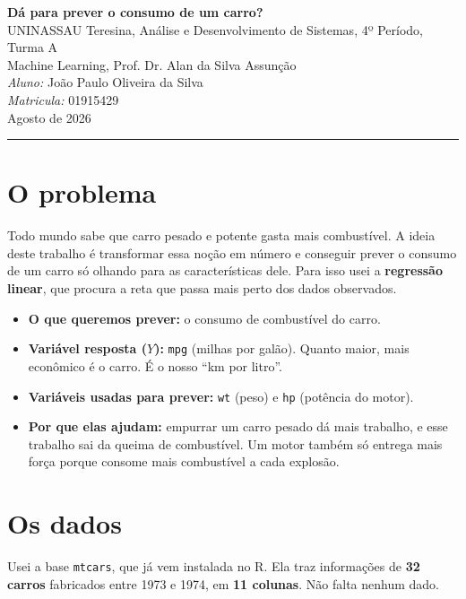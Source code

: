 \documentclass[11pt,a4paper]{article}
\begin{document}
\begin{center}
{\Large\bfseries\color{azul} Dá para prever o consumo de um carro?}\\[6pt]
{\small
UNINASSAU Teresina, Análise e Desenvolvimento de Sistemas, 4º Período, Turma A\\
Machine Learning, Prof. Dr. Alan da Silva Assunção\\[4pt]
\textit{Aluno:} João Paulo Oliveira da Silva\\[4pt]
\textit{Matricula:} 01915429\\[4pt]
Agosto de 2026}
\end{center}
\vspace{2pt}\hrule\vspace{4pt}

\section{O problema}

Todo mundo sabe que carro pesado e potente gasta mais combustível. A ideia deste trabalho é transformar essa noção em número e conseguir prever o consumo de um carro só olhando para as características dele. Para isso usei a \textbf{regressão linear}, que procura a reta que passa mais perto dos dados observados.

\begin{itemize}
  \item \textbf{O que queremos prever:} o consumo de combustível do carro.
  \item \textbf{Variável resposta ($Y$):} \texttt{mpg} (milhas por galão). Quanto maior, mais econômico é o carro. É o nosso ``km por litro''.
  \item \textbf{Variáveis usadas para prever:} \texttt{wt} (peso) e \texttt{hp} (potência do motor).
  \item \textbf{Por que elas ajudam:} empurrar um carro pesado dá mais trabalho, e esse trabalho sai da queima de combustível. Um motor também só entrega mais força porque consome mais combustível a cada explosão.
\end{itemize}

\section{Os dados}

Usei a base \texttt{mtcars}, que já vem instalada no R. Ela traz informações de \textbf{32 carros} fabricados entre 1973 e 1974, em \textbf{11 colunas}. Não falta nenhum dado.
\end{document}
